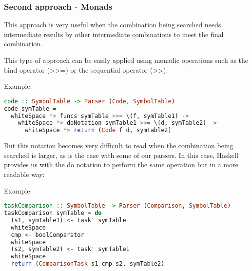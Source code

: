 \documentclass{article}
\begin{document}
\subsubsection*{Second approach - Monads}
This approach is very useful when the combination being searched needs intermediate results by other intermediate combinations to meet the final combination.

This type of approach can be easily applied using monadic operations such as the bind operator (>>=) or the sequential operator (>>).

Example:

\begin{lstlisting}[language=Haskell]
code :: SymbolTable -> Parser (Code, SymbolTable)
code symTable =
  whiteSpace *> funcs symTable >>= \(f, symTable1) ->
    whiteSpace *> doNotation symTable1 >>= \(d, symTable2) ->
      whiteSpace *> return (Code f d, symTable2)
\end{lstlisting}

But this notation becomes very difficult to read when the combination being searched is larger, as is the case with some of our parsers. In this case, Haskell provides us with the do notation to perform the same operation but in a more readable way:

Example:

\begin{lstlisting}[language=Haskell]
taskComparison :: SymbolTable -> Parser (Comparison, SymbolTable)
taskComparison symTable = do
  (s1, symTable1) <- task' symTable
  whiteSpace
  cmp <- boolComparator
  whiteSpace
  (s2, symTable2) <- task' symTable1
  whiteSpace
  return (ComparisonTask s1 cmp s2, symTable2)
\end{lstlisting}
\end{document}
